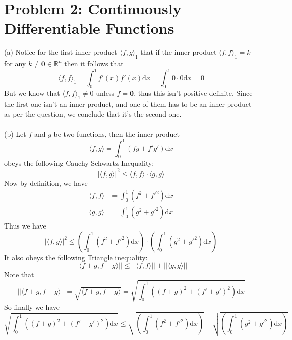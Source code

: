 \documentclass{article}
\begin{document}
\section*{Problem 2: Continuously Differentiable Functions}
(a) Notice for the first inner product $\langle f, g\rangle_{1}$ that if the inner product $\langle f, f\rangle_{1} = k$ for any $k \neq \mathbf{0} \in \mathbb{R}^{n}$ then it follows that
\begin{equation*}
    \langle f, f\rangle_{1} = \int_{0}^{1} f'(x)f'(x)\text{d}x = \int_{0}^{1} 0\cdot 0\text{d}x = 0
\end{equation*}
But we know that $\langle f, f\rangle_{1} \neq 0$ unless $f = \mathbf{0}$, thus this isn't positive definite. Since the first one isn't an inner product, and one of them has to be an inner product as per the question, we conclude that it's the second one. \\\\
(b) Let $f$ and $g$ be two functions, then the inner product
\begin{equation*}
    \langle f, g\rangle = \int_{0}^{1}(fg + f'g')\text{d}x
\end{equation*}
obeys the following Cauchy-Schwartz Inequality:
\begin{equation*}
    |\langle f, g \rangle |^2 \leq \langle f,f \rangle \cdot \langle g, g\rangle 
\end{equation*}
Now by definition, we have
\begin{align*}
    \langle f, f\rangle &= \int_{0}^{1}(f^2 + f'^2)\text{d}x\\
    \langle g, g\rangle &= \int_{0}^{1}(g^2 + g'^2)\text{d}x
\end{align*}
Thus we have
\begin{equation*}
    |\langle f, g\rangle |^2 \leq \left(\int_{0}^{1}(f^2 + f'^2)\text{d}x\right)\cdot \left(\int_{0}^{1}(g^2 + g'^2)\text{d}x\right)
\end{equation*}
It also obeys the following Triangle inequality:
\begin{equation*}
    ||\langle f + g, f + g \rangle|| \leq ||\langle f, f\rangle || + ||\langle g,g\rangle ||
\end{equation*}
Note that 
\begin{equation*}
    ||\langle f + g, f + g\rangle || = \sqrt{\langle f + g, f + g \rangle} = \sqrt{\int_{0}^{1}((f+g)^2 + (f' + g')^2)\text{d}x}
\end{equation*}
So finally we have
\begin{equation*}
    \sqrt{\int_{0}^{1}((f+g)^2 + (f' + g')^2)\text{d}x} \leq \sqrt{\left(\int_{0}^{1}(f^2 + f'^2)\text{d}x\right)} + \sqrt{\left(\int_{0}^{1}(g^2 + g'^2)\text{d}x\right)}
\end{equation*}
\end{document}
